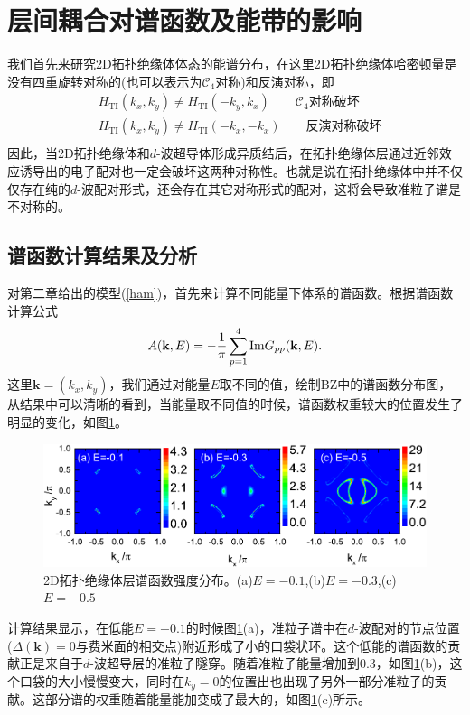 \section{层间耦合对谱函数及能带的影响}
 我们首先来研究2D拓扑绝缘体体态的能谱分布，在这里2D拓扑绝缘体哈密顿量是没有四重旋转对称的(也可以表示为$\mathcal{C}_4$对称)和反演对称，即
\begin{equation}
\begin{aligned}
&H_{\mathrm{TI}}(k_x,k_y)\neq H_\mathrm{TI}(-k_y,k_x)\qquad \textrm{$\mathcal{C}_4$对称破坏}\\
&H_{\mathrm{TI}}(k_x,k_y)\neq H_\mathrm{TI}(-k_x,-k_x)\qquad\textrm{反演对称破坏}\\
\end{aligned}
\end{equation}
因此，当2D拓扑绝缘体和$d$-波超导体形成异质结后，在拓扑绝缘体层通过近邻效应诱导出的电子配对也一定会破坏这两种对称性。也就是说在拓扑绝缘体中并不仅仅存在纯的$d$-波配对形式，还会存在其它对称形式的配对，这将会导致准粒子谱是不对称的。
\subsection{谱函数计算结果及分析}
 对第二章给出的模型(\ref{ham})，首先来计算不同能量下体系的谱函数。根据谱函数计算公式
\begin{equation}
A({\bf k},E)=-\frac{1}{\pi}\sum^4_{p=1}\mathrm{Im} G_{pp}({\bf k},E).
\end{equation}
这里$\mathbf{k}=(k_x,k_y)$，我们通过对能量$E$取不同的值，绘制BZ中的谱函数分布图，从结果中可以清晰的看到，当能量取不同值的时候，谱函数权重较大的位置发生了明显的变化，如图\ref{fig16}。
\begin{figure}[h]
\centering
\includegraphics[scale=0.9]{pic/fig17.pdf}
\caption{2D拓扑绝缘体层谱函数强度分布。(a)$E=-0.1$,(b)$E=-0.3$,(c)$E=-0.5$}\label{fig16}
\end{figure}
计算结果显示，在低能$E=-0.1$的时候图\ref{fig16}(a)，准粒子谱中在$d$-波配对的节点位置($\Delta(\mathbf{k})=0$与费米面的相交点)附近形成了小的口袋状环。这个低能的谱函数的贡献正是来自于$d$-波超导层的准粒子隧穿\cite{re59}。随着准粒子能量增加到0.3，如图\ref{fig16}(b)，这个口袋的大小慢慢变大，同时在$k_y=0$的位置出也出现了另外一部分准粒子的贡献。这部分谱的权重随着能量能加变成了最大的，如图\ref{fig16}(c)所示。

